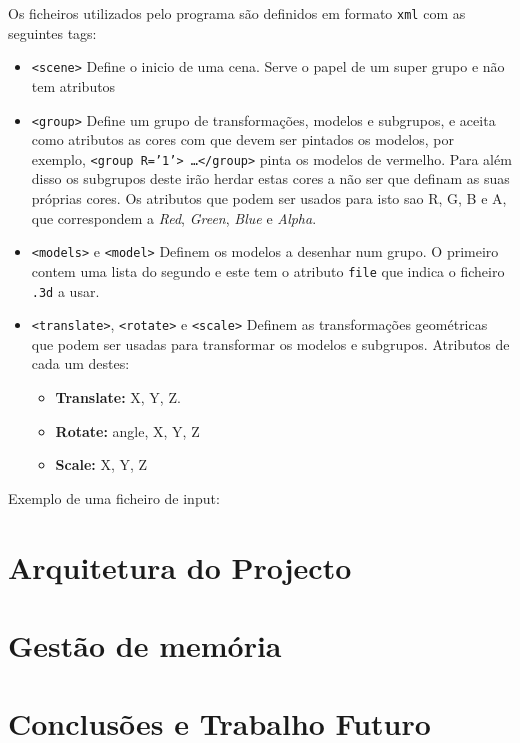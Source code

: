 \documentclass[a4paper]{article}
\begin{document}
Os ficheiros utilizados pelo programa são definidos em formato \texttt{xml} com as seguintes tags:
\begin{itemize}
    \item \texttt{<scene>} Define o inicio de uma cena. Serve o papel de um
        super grupo e não tem atributos
    \item \texttt{<group>} Define um grupo de transformações, modelos e
        subgrupos, e aceita como atributos as cores com que devem ser pintados
        os modelos, por exemplo,
        \texttt{<group R='1'> \ldots </group>} pinta os modelos de vermelho.
        Para além disso os subgrupos deste irão herdar estas cores a não ser
        que definam as suas próprias cores. Os atributos que podem ser usados
        para isto sao R, G, B e A, que correspondem a \textit{Red},
        \textit{Green}, \textit{Blue} e \textit{Alpha}.
    \item \texttt{<models>} e \texttt{<model>} Definem os modelos a desenhar
        num grupo. O primeiro contem uma lista do segundo e este tem o atributo
        \texttt{file} que indica o ficheiro \texttt{.3d} a usar.
    \item \texttt{<translate>}, \texttt{<rotate>} e \texttt{<scale>} Definem as
        transformações geométricas que podem ser usadas para transformar os
        modelos e subgrupos. Atributos de cada um destes:
        \begin{itemize}
            \item \textbf{Translate:} X, Y, Z.
            \item \textbf{Rotate:} angle, X, Y, Z
            \item \textbf{Scale:} X, Y, Z
        \end{itemize}
\end{itemize}

Exemplo de uma ficheiro de input:


\section{Arquitetura do Projecto}

\section{Gestão de memória}

\section{Conclusões e Trabalho Futuro}
\end{document}
